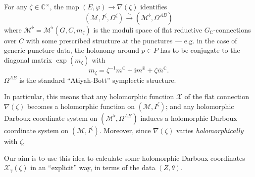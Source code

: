 \documentclass[12pt,letterpaper,reqno]{article}
\numberwithin{equation}{section}
\newcommand{\cM}{\ensuremath{\mathcal M}}
\newcommand{\cX}{\ensuremath{\mathcal X}}
\newcommand{\R}{\ensuremath{\mathbb R}}
\newcommand{\C}{\ensuremath{\mathbb C}}
\newcommand{\I}{{\mathrm i}}
\newcommand{\simarrow}{\xrightarrow\sim}
\newcommand{\ti}[1]{\textit{#1}}
\begin{document}
\begin{prop} For any $\zeta \in \C^\times$,
the map $(E,\varphi) \to \nabla(\zeta)$ identifies
\begin{equation}
  (\cM, I^\zeta, \Omega^\zeta) \simarrow (\cM^\flat, \Omega^{AB})
\end{equation}
where $\cM^\flat = \cM^\flat(G, C, m_\zeta)$
is the moduli space of flat reductive 
$G_\C$-connections
over $C$ with some prescribed structure at the punctures ---
e.g. in the case of generic puncture data,
the holonomy around $p \in P$ has to be conjugate to 
the diagonal matrix $\exp(m_\zeta)$ with
\begin{equation}
m_\zeta = \zeta^{-1} m^\C + \I m^\R + \zeta \overline{m}^\C. 
\end{equation}
$\Omega^{AB}$ is the standard ``Atiyah-Bott'' symplectic
structure.
\end{prop}

In particular, this means that any holomorphic function $\cX$ of
the flat connection $\nabla(\zeta)$ becomes a holomorphic
function on $(\cM, I^\zeta)$; and any holomorphic 
Darboux coordinate system on $(\cM^\flat, \Omega^{AB})$
induces a holomorphic Darboux coordinate system on
$(\cM, I^\zeta)$. Moreover, since $\nabla(\zeta)$ varies
\ti{holomorphically} with $\zeta$,

Our aim is to use this idea to calculate some holomorphic Darboux
coordinates $\cX_\gamma(\zeta)$ in an ``explicit'' way,
in terms of the data $(Z, \theta)$.
\end{document}
